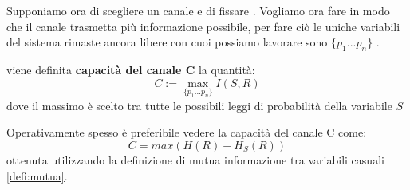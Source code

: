 Supponiamo ora di scegliere un canale e di fissare \lepc . Vogliamo ora fare in modo che il canale trasmetta più informazione possibile, per fare ciò le uniche variabili del sistema rimaste ancora libere con cuoi possiamo lavorare sono $\{p_1...p_n \}$ .
\begin{defi}
viene definita \textbf{capacità del canale C} la quantità:
\begin{equation}
C:= \max_{ \{ p_1...p_n \}} I(S,R)
\end{equation}
dove il massimo è scelto tra tutte le possibili leggi di probabilità della variabile $S$
\end{defi}
Operativamente spesso è preferibile vedere la capacità del canale C come:
\begin{equation}
C=max(H(R)-H_S(R))
\end{equation}
ottenuta utilizzando la definizione di mutua informazione tra variabili casuali \ref{defi:mutua}.\\
